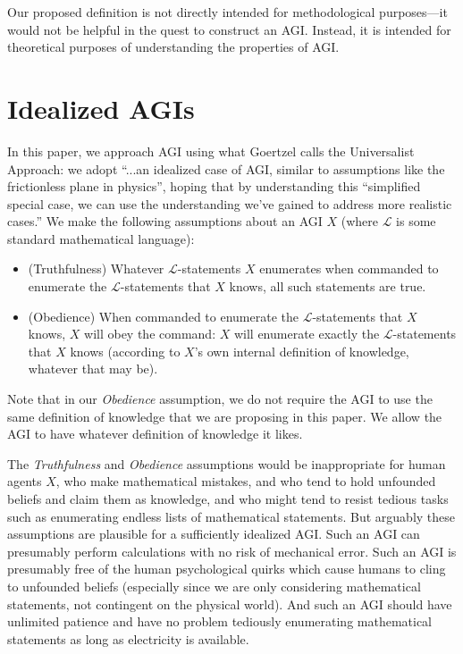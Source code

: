 \documentclass[runningheads]{llncs}
\begin{document}
Our proposed definition is not directly intended
for methodological purposes---it would not
be helpful in the quest to construct an AGI. Instead, it is intended for
theoretical purposes of understanding the properties of AGI.


\section{Idealized AGIs}

In this paper, we approach AGI using what
Goertzel \cite{goertzel2014artificial} calls
the Universalist Approach:
we adopt ``...an idealized case of AGI, similar to
assumptions like the frictionless plane in physics'', hoping that by
understanding this ``simplified special
case, we can use the understanding we've gained to address more realistic
cases.'' We make the following assumptions about an AGI $X$
(where $\mathscr L$ is some standard mathematical language):
\begin{itemize}
  \item (Truthfulness) Whatever $\mathscr L$-statements $X$ enumerates
  when commanded to enumerate the $\mathscr L$-statements that $X$ knows,
  all such statements are true.
  \item (Obedience) When commanded to enumerate the $\mathscr L$-statements that $X$ knows,
  $X$ will obey the command: $X$ will enumerate exactly the
  $\mathscr L$-statements that $X$ knows (according to $X$'s own internal definition
  of knowledge, whatever that may be).
\end{itemize}

Note that in our \emph{Obedience} assumption, we do not require the AGI to use
the same definition of knowledge that we are proposing in this paper. We allow
the AGI to have whatever definition of knowledge it likes.

The \emph{Truthfulness} and \emph{Obedience} assumptions would be inappropriate
for human agents $X$, who make mathematical
mistakes, and who tend to hold unfounded beliefs and claim them as knowledge,
and who might tend to resist tedious tasks such as enumerating endless lists of
mathematical statements. But arguably these assumptions are plausible for a
sufficiently idealized AGI. Such an AGI can presumably perform calculations with
no risk of mechanical error. Such an AGI is presumably free of the human
psychological quirks which cause humans to cling to unfounded beliefs (especially
since we are only considering mathematical statements, not contingent on
the physical world). And such an AGI should have unlimited patience and have no
problem tediously enumerating mathematical statements as long as electricity is
available.
\end{document}
